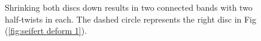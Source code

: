 \documentclass{article}
\begin{document}
{\begin{figure}
%
%
%
\caption{Shrinking both discs down results in two connected bands with two half-twists in each. The dashed circle represents the right disc in Fig (\ref{fig:seifert deform 1}).}
\label{fig:seifert deform 2}
\end{figure}

}
\end{document}
